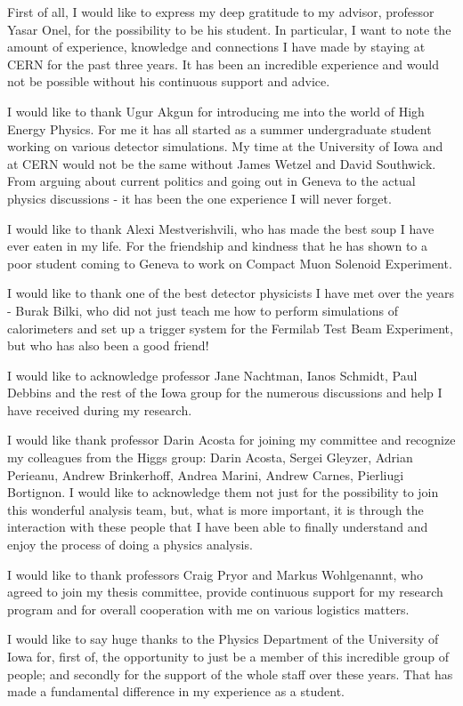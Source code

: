 First of all, I would like to express my deep gratitude to my advisor, professor Yasar Onel, for the possibility to be his student. In particular, I want to note the amount of experience, knowledge and connections I have made by staying at CERN for the past three years. It has been an incredible experience and would not be possible without his continuous support and advice.

I would like to thank Ugur Akgun for introducing me into the world of High Energy Physics. For me it has all started as a summer undergraduate student working on various detector simulations. My time at the University of Iowa and at CERN would not be the same without James Wetzel and David Southwick. From arguing about current politics and going out in Geneva to the actual physics discussions - it has been the one experience I will never forget.

I would like to thank Alexi Mestverishvili, who has made the best soup I have ever eaten in my life. For the friendship and kindness that he has shown to a poor student coming to Geneva to work on Compact Muon Solenoid Experiment.

I would like to thank one of the best detector physicists I have met over the years - Burak Bilki, who did not just teach me how to perform simulations of calorimeters and set up a trigger system for the Fermilab Test Beam Experiment, but who has also been a good friend!

I would like to acknowledge professor Jane Nachtman, Ianos Schmidt, Paul Debbins and the rest of the Iowa group for the numerous discussions and help I have received during my research.

I would like thank professor Darin Acosta for joining my committee and recognize my colleagues from the Higgs group: Darin Acosta, Sergei Gleyzer, Adrian Perieanu, Andrew Brinkerhoff, Andrea Marini, Andrew Carnes, Pierliugi Bortignon. I would like to acknowledge them not just for the possibility to join this wonderful analysis team, but, what is more important, it is through the interaction with these people that I have been able to finally understand and enjoy the process of doing a physics analysis.

I would like to thank professors Craig Pryor and Markus Wohlgenannt, who agreed to join my thesis committee, provide continuous support for my research program and for overall cooperation with me on various logistics matters.

I would like to say huge thanks to the Physics Department of the University of Iowa for, first of, the opportunity to just be a member of this incredible group of people; and secondly for the support of the whole staff over these years. That has made a fundamental difference in my experience as a student.

